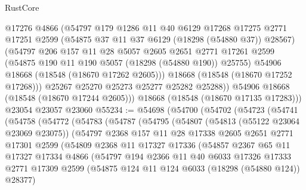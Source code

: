 \begin{lexlean}{RustCore}
\begin{coremodule}
            @17276
            @4866
            (@54797
              @179
              @1286
              @11
              @40
              @6129
              @17268
              @17275
              @2771
              @17251
              @2599
              (@54875 @37 @11 @37 @6129 (@18298 (@54880 @37)) @28567)
              (@54797
                @206
                @157
                @11
                @28
                @5057
                @2605
                @2651
                @2771
                @17261
                @2599
                (@54875 @190 @11 @190 @5057 (@18298 (@54880 @190)) @25755)
                @54906
                @18668
                (@18548 (@18670 @17262 @2605)))
              @18668
              (@18548 (@18670 @17252 @17268)))
            @25267
            @25270
            @25273
            @25277
            @25282
            @25288))
        @54906
        @18668
        (@18548 (@18670 @17244 @2605)))
      @18668
      (@18548 (@18670 @17135 @17283)))
    @23054
    @23057
    @23060
@55234 := @54698
    (@54700
      (@54702
        (@54723
          (@54741
            (@54758
              (@54772
                (@54783
                  (@54787
                    (@54795
                      (@54807
                        (@54813 (@55122 @23064 @23069 @23075))
                        (@54797
                          @2368
                          @157
                          @11
                          @28
                          @17338
                          @2605
                          @2651
                          @2771
                          @17301
                          @2599
                          (@54809
                            @2368
                            @11
                            @17327
                            @17336
                            (@54857
                              @2367
                              @65
                              @11
                              @17327
                              @17334
                              @4866
                              (@54797
                                @194
                                @2366
                                @11
                                @40
                                @6033
                                @17326
                                @17333
                                @2771
                                @17309
                                @2599
                                (@54875 @124 @11 @124 @6033 (@18298 (@54880 @124)) @28377)

\end{coremodule}
\end{lexlean}
